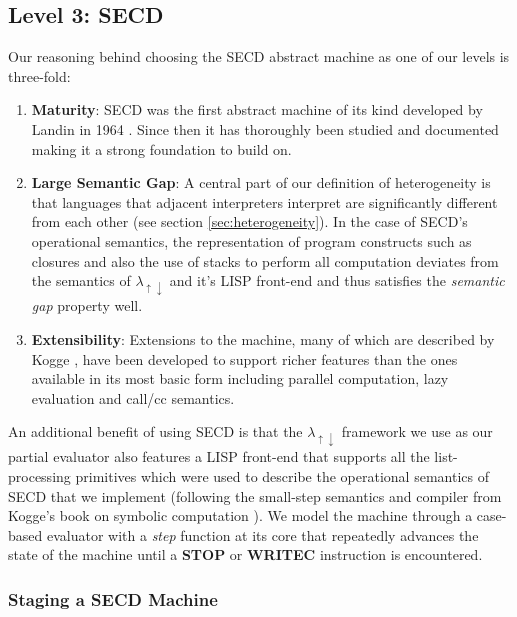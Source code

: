 \documentclass[a4paper,12pt,twoside,openright]{report}
\theoremstyle{definition}
\newcommand{\mslang}{$\lambda_{\uparrow\downarrow}$}
\begin{document}
\subsection{Level 3: SECD}\label{sec:secd}
Our reasoning behind choosing the SECD abstract machine as one of our levels is three-fold:
\begin{enumerate}
	\item \textbf{Maturity}: SECD was the first abstract machine of its kind developed by Landin in 1964 \cite{landin1964mechanical}. Since then it has thoroughly been studied and documented \cite{danvy2004rational,ramsdell1999tail,henderson1980functional} making it a strong foundation to build on.
	\item \textbf{Large Semantic Gap}: A central part of our definition of heterogeneity is that languages that adjacent interpreters interpret are significantly different from each other (see section \ref{sec:heterogeneity}). In the case of SECD's operational semantics, the representation of program constructs such as closures and also the use of stacks to perform all computation deviates from the semantics of \mslang{} and it's LISP front-end and thus satisfies the \textit{semantic gap} property well.
	\item \textbf{Extensibility}: Extensions to the machine, many of which are described by Kogge \cite{kogge1990architecture}, have been developed to support richer features than the ones available in its most basic form including parallel computation, lazy evaluation and call/cc semantics.
\end{enumerate}
An additional benefit of using SECD is that the \mslang{} framework we use as our partial evaluator also features a LISP front-end that supports all the list-processing primitives which were used to describe the operational semantics of SECD that we implement (following the small-step semantics and compiler from Kogge's book on symbolic computation \cite{kogge1990architecture}). We model the machine through a case-based evaluator with a \textit{step} function at its core that repeatedly advances the state of the machine until a \textbf{STOP} or \textbf{WRITEC} instruction is encountered.

\subsubsection{Staging a SECD Machine}\label{subsec:secd_staged}
\end{document}
